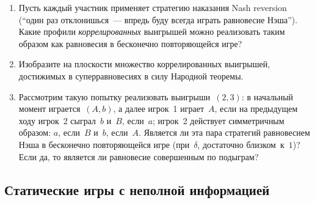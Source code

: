 \documentclass[a4paper,12pt]{article}
\begin{document}
\begin{enumerate}
\begin{enumerate}

\item Пусть каждый участник применяет стратегию наказания
Nash reversion (``один раз отклонишься~--- впредь буду
всегда играть равновесие Нэша''). Какие профили {\em
коррелированных} выигрышей можно реализовать таким образом
как равновесия в бесконечно повторяющейся игре?

\item Изобразите на плоскости множество коррелированных
выигрышей, достижимых в суперравновесиях в силу Народной
теоремы.

\item Рассмотрим такую попытку реализовать
выигрыши~$(2,3)$: в начальный момент играется~$(A,b)$, а
далее игрок~1 играет~$A$, если на предыдущем ходу игрок~2
сыграл~$b$ и~$B$, если~$a$; игрок~2 действует симметричным
образом: $a$, если~$B$ и~$b$, если~$A$. Является ли эта
пара стратегий равновесием Нэша в бесконечно повторяющейся
игре (при~$\delta$, достаточно близком~к~$1$)? Если да, то
является ли равновесие совершенным по подыграм?

\end{enumerate}

\end{enumerate}

\subsection{Статические игры с неполной информацией}
\end{document}
